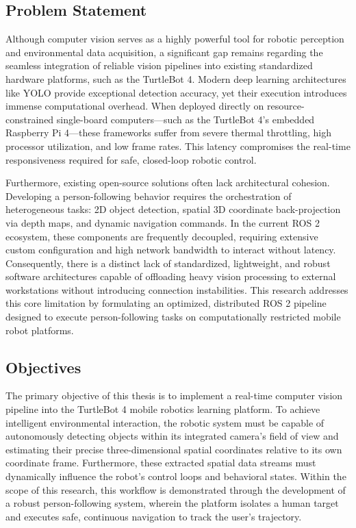
\subsection{Problem Statement} %
Although computer vision serves as a highly powerful tool for robotic perception and environmental data acquisition, a significant gap remains regarding the seamless integration of reliable vision pipelines into existing standardized hardware platforms, such as the TurtleBot 4. Modern deep learning architectures like YOLO provide exceptional detection accuracy, yet their execution introduces immense computational overhead. When deployed directly on resource-constrained single-board computers—such as the TurtleBot 4’s embedded Raspberry Pi 4—these frameworks suffer from severe thermal throttling, high processor utilization, and low frame rates. This latency compromises the real-time responsiveness required for safe, closed-loop robotic control.

Furthermore, existing open-source solutions often lack architectural cohesion. Developing a person-following behavior requires the orchestration of heterogeneous tasks: 2D object detection, spatial 3D coordinate back-projection via depth maps, and dynamic navigation commands. In the current ROS 2 ecosystem, these components are frequently decoupled, requiring extensive custom configuration and high network bandwidth to interact without latency. Consequently, there is a distinct lack of standardized, lightweight, and robust software architectures capable of offloading heavy vision processing to external workstations without introducing connection instabilities. This research addresses this core limitation by formulating an optimized, distributed ROS 2 pipeline designed to execute person-following tasks on computationally restricted mobile robot platforms.
 

\subsection{Objectives} %
The primary objective of this thesis is to implement a real-time computer vision pipeline into the TurtleBot 4 mobile robotics learning platform. To achieve intelligent environmental interaction, the robotic system must be capable of autonomously detecting objects within its integrated camera's field of view and estimating their precise three-dimensional spatial coordinates relative to its own coordinate frame. Furthermore, these extracted spatial data streams must dynamically influence the robot's control loops and behavioral states. Within the scope of this research, this workflow is demonstrated through the development of a robust person-following system, wherein the platform isolates a human target and executes safe, continuous navigation to track the user's trajectory.

